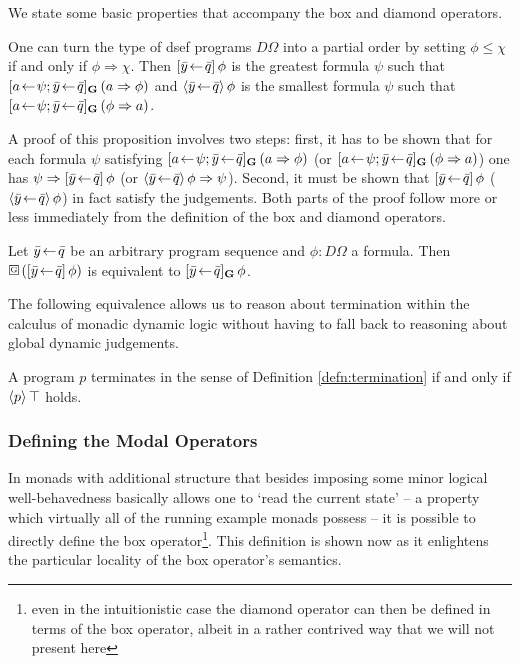 We state some basic properties that accompany the box and diamond operators.
\begin{prop} \label{thm:unique-determ}
  One can turn the type of dsef programs $D\Omega$ into a partial order by setting $\phi
  \leq \chi$ if and only if $\phi \Rightarrow \chi$. Then $[\bar y\!\gets\!\bar q]\,\phi$ is the
  greatest formula $\psi$ such that 
  $[a\!\gets\! \psi; \bar y\!\gets\!\bar q]_\mathbf{G}\,(a\Rightarrow\phi)$
  and $\langle\bar y\!\gets\!\bar q\rangle\,\phi$ is the smallest formula $\psi$ such that 
  $[a\!\gets\! \psi; \bar y\!\gets\!\bar q]_\mathbf{G}\,(\phi\Rightarrow a)$.
\end{prop}
A proof of this proposition involves two steps: first, it has to be shown that
for each formula $\psi$ satisfying $[a\!\gets\! \psi; \bar y\!\gets\!\bar q]_\mathbf{G}\,(a\Rightarrow\phi)$ (or
$[a\!\gets\! \psi; \bar y\!\gets\!\bar q]_\mathbf{G}\,(\phi\Rightarrow a)$) one has $\psi \Rightarrow [\bar y\!\gets\!\bar
  q]\,\phi$ (or $\langle\bar y\!\gets\!\bar q\rangle\,\phi \Rightarrow \psi$). Second, it must be shown that
$[\bar y\!\gets\!\bar q]\,\phi$ ($\langle\bar y\!\gets\!\bar q\rangle\,\phi$) in fact satisfy
the judgements. Both parts of the proof follow more or less immediately from the
definition of the box and diamond operators.

\begin{prop}
  Let $\bar y\!\gets\! \bar q$ be an arbitrary program sequence and $\phi : D\Omega$ a
  formula. Then $\gbox(\PDLBox{\bar y\leteq\bar q}\phi)$ is equivalent to
  $[\bar y\!\gets\! \bar q]_\mathbf{G}\,\phi$.
\end{prop}

The following equivalence allows us to reason about termination within the
calculus of monadic dynamic logic without having to fall back to reasoning about
global dynamic judgements.
\begin{prop}[Termination]
  A program $p$ terminates in the sense of Definition \ref{defn:termination} if
  and only if $\langle p\rangle\,\top$ holds.
\end{prop}


\subsubsection{Defining the Modal Operators}
In monads with additional structure that besides imposing some minor logical
well-be\-haved\-ness basically allows one to `read the current state' -- a
property which virtually all of the running example monads possess -- it is
possible to directly define the box operator\footnote{even in the intuitionistic
  case the diamond operator can then be defined in terms of the box operator,
  albeit in a rather contrived way that we will not present here}. This
definition is shown now as it enlightens the particular locality of the box
operator's semantics.

